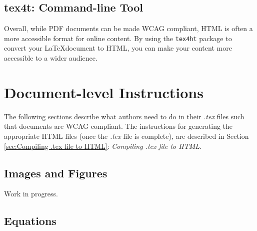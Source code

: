 \documentclass{llncs}
\newcommand{\code}[1]{\colorbox{light-gray}{\texttt{#1}}}
\begin{document}
\subsection{tex4t: Command-line Tool}

Overall, while PDF documents can be made WCAG compliant, HTML is often a more
accessible format for online content. By using the \code{tex4ht} package to
convert your \LaTeX document to HTML, you can make your content more accessible
to a wider audience.



\section{Document-level Instructions}

The following sections describe what authors need to do in their \textit{.tex}
files such that documents are WCAG compliant. The instructions for generating
the appropriate HTML files (once the \textit{.tex} file is complete), are
described in Section \ref{sec:Compiling .tex file to HTML}: \textit{Compiling
  .tex file to HTML}.


\subsection{Images and Figures}

Work in progress.





\subsection{Equations}
\end{document}
